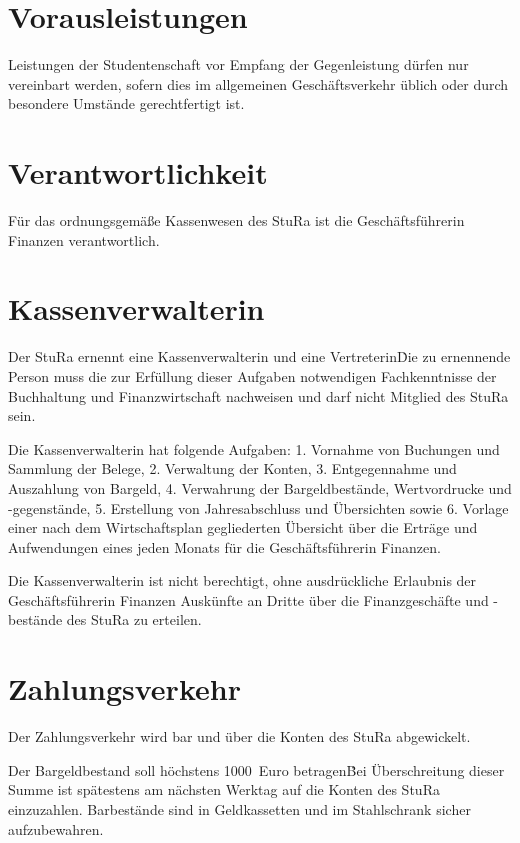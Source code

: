 \section{Vorausleistungen}

\Abs \Satz Leistungen der Studentenschaft vor Empfang der Gegenleistung dürfen nur vereinbart werden, sofern dies im allgemeinen Geschäftsverkehr üblich oder durch besondere Umstände gerechtfertigt ist.



\section{Verantwortlichkeit}

\Abs \Satz Für das ordnungsgemäße Kassenwesen des StuRa ist die Geschäftsführerin Finanzen verantwortlich.



\section{Kassenverwalterin}

\Abs \Satz Der StuRa ernennt eine Kassenverwalterin und eine Vertreterin\. Die zu ernennende Person muss die zur Erfüllung dieser Aufgaben notwendigen Fachkenntnisse der Buchhaltung und Finanzwirtschaft nachweisen und darf nicht Mitglied des StuRa sein.

\Abs \Satz Die Kassenverwalterin hat folgende Aufgaben:
1. Vornahme von Buchungen und Sammlung der Belege,
2. Verwaltung der Konten,
3. Entgegennahme und Auszahlung von Bargeld,
4. Verwahrung der Bargeldbestände, Wertvordrucke und -gegenstände,
5. Erstellung von Jahresabschluss und Übersichten sowie
6. Vorlage einer nach dem Wirtschaftsplan gegliederten Übersicht über die Erträge und Aufwendungen eines jeden Monats für die Geschäftsführerin Finanzen.

\Abs \Satz Die Kassenverwalterin ist nicht berechtigt, ohne ausdrückliche Erlaubnis der Geschäftsführerin Finanzen Auskünfte an Dritte über die Finanzgeschäfte und -bestände des StuRa zu erteilen.



\section{Zahlungsverkehr}

\Abs \Satz Der Zahlungsverkehr wird bar und über die Konten des StuRa abgewickelt.

\Abs \Satz Der Bargeldbestand soll höchstens 1000~Euro betragen\. Bei Überschreitung dieser Summe ist spätestens am nächsten Werktag auf die Konten des StuRa einzuzahlen. Barbestände sind in Geldkassetten und im Stahlschrank sicher aufzubewahren.

